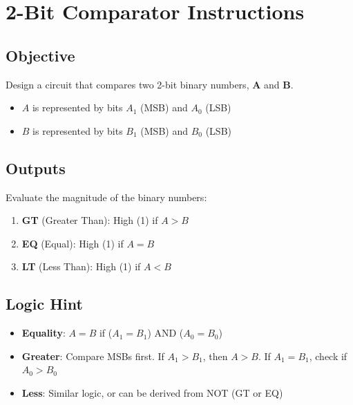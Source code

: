 \section*{2-Bit Comparator Instructions}

\subsection*{Objective}
Design a circuit that compares two 2-bit binary numbers, $\mathbf{A}$ and $\mathbf{B}$.
\begin{itemize}
  \item $A$ is represented by bits $A_1$ (MSB) and $A_0$ (LSB)
  \item $B$ is represented by bits $B_1$ (MSB) and $B_0$ (LSB)
\end{itemize}

\subsection*{Outputs}
Evaluate the magnitude of the binary numbers:
\begin{enumerate}
  \item \textbf{GT} (Greater Than): High (1) if $A > B$
  \item \textbf{EQ} (Equal): High (1) if $A = B$
  \item \textbf{LT} (Less Than): High (1) if $A < B$
\end{enumerate}

\subsection*{Logic Hint}
\begin{itemize}
  \item \textbf{Equality}: $A = B$ if ($A_1 = B_1$) AND ($A_0 = B_0$)
  \item \textbf{Greater}: Compare MSBs first. If $A_1 > B_1$, then $A > B$. If $A_1 = B_1$, check if $A_0 > B_0$
  \item \textbf{Less}: Similar logic, or can be derived from NOT (GT or EQ)
\end{itemize}
